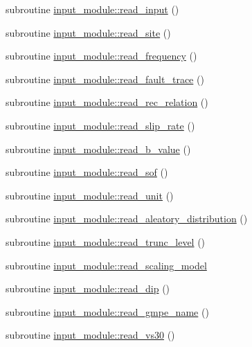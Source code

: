 \begin{DoxyCompactItemize}
\item 
subroutine \hyperlink{namespaceinput__module_a00c4a5d066f42d27b85b05a38bed5160}{input\+\_\+module\+::read\+\_\+input} ()
\item 
subroutine \hyperlink{namespaceinput__module_a07cd15a61e7f02633605f2f442ceb937}{input\+\_\+module\+::read\+\_\+site} ()
\item 
subroutine \hyperlink{namespaceinput__module_afa2966a0e5fac1ac508ed7aed4f0a3d8}{input\+\_\+module\+::read\+\_\+frequency} ()
\item 
subroutine \hyperlink{namespaceinput__module_a0d373b7166a3c84647da12172e1ea635}{input\+\_\+module\+::read\+\_\+fault\+\_\+trace} ()
\item 
subroutine \hyperlink{namespaceinput__module_a1e706b509f806cf51ec52d88f6be16f5}{input\+\_\+module\+::read\+\_\+rec\+\_\+relation} ()
\item 
subroutine \hyperlink{namespaceinput__module_a162c082b34aa3c082906be0b3260e07b}{input\+\_\+module\+::read\+\_\+slip\+\_\+rate} ()
\item 
subroutine \hyperlink{namespaceinput__module_aeafdecc4d19831cf533fb2dcaf0a0844}{input\+\_\+module\+::read\+\_\+b\+\_\+value} ()
\item 
subroutine \hyperlink{namespaceinput__module_acc844c5a0060bf20c9ae19ac3d2e3740}{input\+\_\+module\+::read\+\_\+sof} ()
\item 
subroutine \hyperlink{namespaceinput__module_af0a24a3c1c27d7891b4ca97e8cbf73e8}{input\+\_\+module\+::read\+\_\+unit} ()
\item 
subroutine \hyperlink{namespaceinput__module_a05356d7be39772919ba250f4ea4da2f3}{input\+\_\+module\+::read\+\_\+aleatory\+\_\+distribution} ()
\item 
subroutine \hyperlink{namespaceinput__module_a57f855a995185ff6d52c0a402a4a536b}{input\+\_\+module\+::read\+\_\+trunc\+\_\+level} ()
\item 
subroutine \hyperlink{namespaceinput__module_a0c45a351fde1aa9a3fe8f15c1d78330e}{input\+\_\+module\+::read\+\_\+scaling\+\_\+model}
\item 
subroutine \hyperlink{namespaceinput__module_ac982cae54a9baa5626ed817f28c75595}{input\+\_\+module\+::read\+\_\+dip} ()
\item 
subroutine \hyperlink{namespaceinput__module_a2b2d0311a6010b3b3e59cd947b58f429}{input\+\_\+module\+::read\+\_\+gmpe\+\_\+name} ()
\item 
subroutine \hyperlink{namespaceinput__module_a4989c6ca8bc90648ca9587bee66d26b1}{input\+\_\+module\+::read\+\_\+vs30} ()

\end{DoxyCompactItemize}
